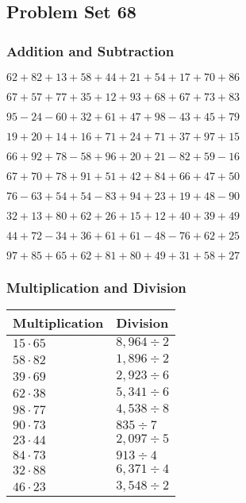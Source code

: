 \hypertarget{problem-set-68}{%
\subsection{Problem Set 68}\label{problem-set-68}}

\hypertarget{addition-and-subtraction}{%
\subsubsection{Addition and
Subtraction}\label{addition-and-subtraction}}

\(62+82+13+58+44+21+54+17+70+86\)

\(67+57+77+35+12+93+68+67+73+83\)

\(95-24-60+32+61+47+98-43+45+79\)

\(19+20+14+16+71+24+71+37+97+15\)

\(66+92+78-58+96+20+21-82+59-16\)

\(67+70+78+91+51+42+84+66+47+50\)

\(76-63+54+54-83+94+23+19+48-90\)

\(32+13+80+62+26+15+12+40+39+49\)

\(44+72-34+36+61+61-48-76+62+25\)

\(97+85+65+62+81+80+49+31+58+27\)

\hypertarget{multiplication-and-division}{%
\subsubsection{Multiplication and
Division}\label{multiplication-and-division}}

\begin{longtable}[]{@{}ll@{}}
\toprule
Multiplication & Division\tabularnewline
\midrule
\endhead
\(15\cdot65\) & \(8,964÷2\)\tabularnewline
\(58\cdot82\) & \(1,896÷2\)\tabularnewline
\(39\cdot69\) & \(2,923÷6\)\tabularnewline
\(62\cdot38\) & \(5,341÷6\)\tabularnewline
\(98\cdot77\) & \(4,538÷8\)\tabularnewline
\(90\cdot73\) & \(835÷7\)\tabularnewline
\(23\cdot44\) & \(2,097÷5\)\tabularnewline
\(84\cdot73\) & \(913÷4\)\tabularnewline
\(32\cdot88\) & \(6,371÷4\)\tabularnewline
\(46\cdot23\) & \(3,548÷2\)\tabularnewline
\bottomrule
\end{longtable}
